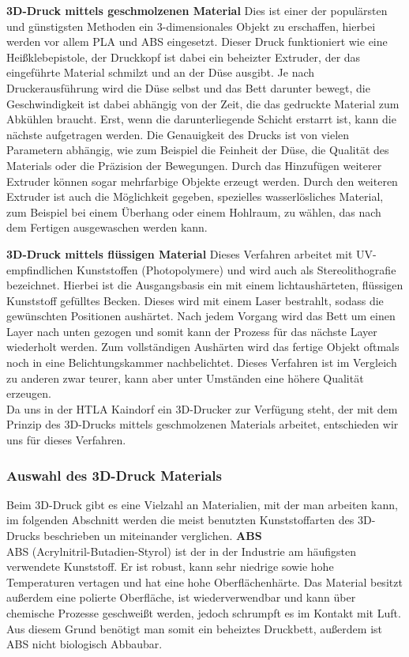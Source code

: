 \textbf{3D-Druck mittels geschmolzenen Material}
Dies ist einer der populärsten und günstigsten Methoden ein 3-dimensionales Objekt zu erschaffen, hierbei werden vor allem PLA und ABS eingesetzt.
Dieser Druck funktioniert wie eine Heißklebepistole, der Druckkopf ist dabei ein beheizter Extruder, der das eingeführte Material schmilzt und an der Düse ausgibt.
Je nach Druckerausführung wird die Düse selbst und das Bett darunter bewegt, die Geschwindigkeit ist dabei abhängig von der Zeit, die das gedruckte Material zum Abkühlen braucht.
Erst, wenn die darunterliegende Schicht erstarrt ist, kann die nächste aufgetragen werden.
Die Genauigkeit des Drucks ist von vielen Parametern abhängig, wie zum Beispiel die Feinheit der Düse, die Qualität des Materials oder die Präzision der Bewegungen.
Durch das Hinzufügen weiterer Extruder können sogar mehrfarbige Objekte erzeugt werden.
Durch den weiteren Extruder ist auch die Möglichkeit gegeben, spezielles wasserlösliches Material, zum Beispiel bei einem Überhang
oder einem Hohlraum, zu wählen, das nach dem Fertigen ausgewaschen werden kann.

\textbf{3D-Druck mittels flüssigen Material}
Dieses Verfahren arbeitet mit UV-empfindlichen Kunststoffen (Photopolymere) und wird auch als Stereolithografie bezeichnet.
Hierbei ist die Ausgangsbasis ein mit einem lichtaushärteten, flüssigen Kunststoff gefülltes Becken.
Dieses wird mit einem Laser bestrahlt, sodass die gewünschten Positionen aushärtet.
Nach jedem Vorgang wird das Bett um einen Layer nach unten gezogen und somit kann der Prozess für das nächste Layer wiederholt werden.
Zum vollständigen Aushärten wird das fertige Objekt oftmals noch in eine Belichtungskammer nachbelichtet.
Dieses Verfahren ist im Vergleich zu anderen zwar teurer, kann aber unter Umständen eine höhere Qualität erzeugen. \\

Da uns in der HTLA Kaindorf ein 3D-Drucker zur Verfügung steht, der mit dem Prinzip des 3D-Drucks mittels geschmolzenen Materials
arbeitet, entschieden wir uns für dieses Verfahren.

\subsubsection{Auswahl des 3D-Druck Materials}
 Beim 3D-Druck gibt es eine Vielzahl an Materialien, mit der man arbeiten kann, im folgenden Abschnitt werden die
meist benutzten Kunststoffarten des 3D-Drucks beschrieben un miteinander verglichen.
\textbf{ABS}\\
ABS (Acrylnitril-Butadien-Styrol) ist der in der Industrie am häufigsten verwendete Kunststoff.
Er ist robust, kann sehr niedrige sowie hohe Temperaturen vertagen und hat eine hohe Oberflächenhärte.
 Das Material besitzt außerdem eine polierte Oberfläche, ist wiederverwendbar und kann über chemische Prozesse geschweißt werden, jedoch schrumpft es im Kontakt mit Luft.
Aus diesem Grund benötigt man somit ein beheiztes Druckbett, außerdem ist ABS
nicht biologisch Abbaubar.

